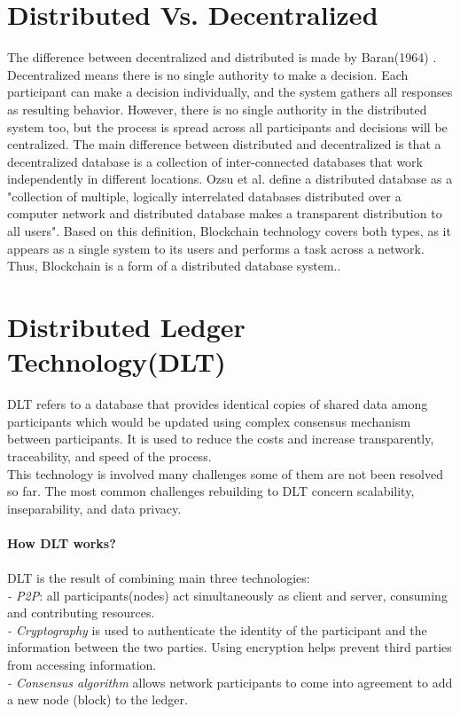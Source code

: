 \section{Distributed Vs. Decentralized } 
The difference between decentralized and distributed is made by Baran(1964) \cite{Baran}. Decentralized means there is no single authority to make a decision. Each participant can make a decision individually, and the system gathers all responses as resulting behavior. However, there is no single authority in the distributed system too, but the process is spread across all participants and decisions will be centralized. The main difference between distributed and decentralized is that a decentralized database is a collection of inter-connected databases that work independently in different locations. Ozsu et al.\cite{Ozsu} define a distributed database as a "collection of multiple, logically interrelated databases distributed over a computer network and distributed database makes a transparent distribution to all users"\cite{Ozsu}. Based on this definition, Blockchain technology covers both types, as it appears as a single system to its users and performs a task across a network. Thus, Blockchain is a form of a distributed database system.\cite{Markos}.


\section{Distributed Ledger Technology(DLT)} 
DLT refers to a database that provides identical copies of shared data among participants which would be updated using complex consensus mechanism between participants. It is used to reduce the costs and increase transparently, traceability, and speed of the process.\\
This technology is involved many challenges some of them are not been resolved so far. The most common challenges rebuilding to DLT concern scalability, inseparability, and data privacy\cite{Ugarte}. \\
\\
\textbf{How DLT works? }\\
\\
DLT is the result of combining main three technologies:\\
\hspace{1cm}\textit{-  P2P}: all participants(nodes) act simultaneously as client and server, consuming and contributing resources.\\
\hspace{1cm}\textit{- Cryptography} is used to authenticate the identity of the participant and the information between the two parties. Using encryption helps prevent third parties from accessing information. \\
\hspace{1cm}\textit{- Consensus algorithm} allows network participants to come into agreement to add a new node (block) to the ledger\cite{Ugarte}.\\

